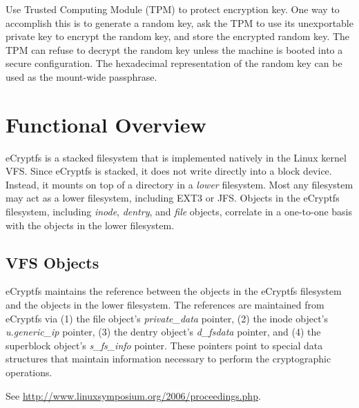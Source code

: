 \documentclass{article}
\begin{document}
Use Trusted Computing Module (TPM) to protect encryption key. One way
to accomplish this is to generate a random key, ask the TPM to use its
unexportable private key to encrypt the random key, and store the
encrypted random key. The TPM can refuse to decrypt the random key
unless the machine is booted into a secure configuration. The
hexadecimal representation of the random key can be used as the
mount-wide passphrase.

\section*{Functional Overview}

eCryptfs is a stacked filesystem that is implemented natively in the
Linux kernel VFS. Since eCryptfs is stacked, it does not write
directly into a block device. Instead, it mounts on top of a directory
in a \emph{lower} filesystem. Most any filesystem may act as a lower
filesystem, including EXT3 or JFS. Objects in the eCryptfs filesystem,
including \emph{inode}, \emph{dentry}, and \emph{file} objects,
correlate in a one-to-one basis with the objects in the lower
filesystem.

\subsection*{VFS Objects}

eCryptfs maintains the reference between the objects in the eCryptfs
filesystem and the objects in the lower filesystem. The references are
maintained from eCryptfs via (1) the file object's \emph{private_data}
pointer, (2) the inode object's \emph{u.generic_ip} pointer, (3) the
dentry object's \emph{d_fsdata} pointer, and (4) the superblock
object's \emph{s_fs_info} pointer. These pointers point to special
data structures that maintain information necessary to perform the
cryptographic operations.



\begin{thebibliography}{1}

 See
  \url{http://www.linuxsymposium.org/2006/proceedings.php}.

\end{thebibliography}
\end{document}
